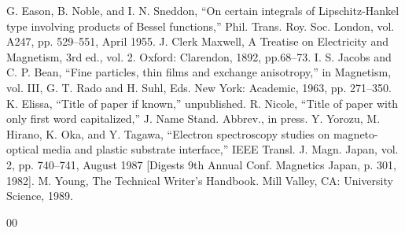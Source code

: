 \documentclass[conference]{IEEEtran}
\begin{document}
\begin{thebibliography}{00}
 G. Eason, B. Noble, and I. N. Sneddon, ``On certain integrals of Lipschitz-Hankel type involving products of Bessel functions,'' Phil. Trans. Roy. Soc. London, vol. A247, pp. 529--551, April 1955.
 J. Clerk Maxwell, A Treatise on Electricity and Magnetism, 3rd ed., vol. 2. Oxford: Clarendon, 1892, pp.68--73.
 I. S. Jacobs and C. P. Bean, ``Fine particles, thin films and exchange anisotropy,'' in Magnetism, vol. III, G. T. Rado and H. Suhl, Eds. New York: Academic, 1963, pp. 271--350.
 K. Elissa, ``Title of paper if known,'' unpublished.
 R. Nicole, ``Title of paper with only first word capitalized,'' J. Name Stand. Abbrev., in press.
 Y. Yorozu, M. Hirano, K. Oka, and Y. Tagawa, ``Electron spectroscopy studies on magneto-optical media and plastic substrate interface,'' IEEE Transl. J. Magn. Japan, vol. 2, pp. 740--741, August 1987 [Digests 9th Annual Conf. Magnetics Japan, p. 301, 1982].
 M. Young, The Technical Writer's Handbook. Mill Valley, CA: University Science, 1989.
\end{thebibliography}

{00}

\end{document}
